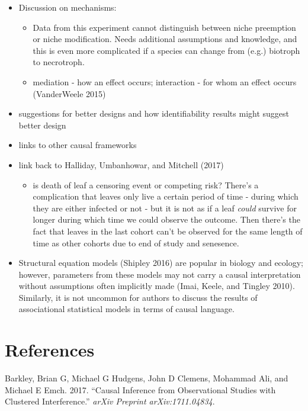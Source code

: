 \documentclass[]{article}
\providecommand{\tightlist}{%
  \setlength{\itemsep}{0pt}\setlength{\parskip}{0pt}}
\begin{document}
\begin{itemize}
\tightlist
\item
  Discussion on mechanisms:

  \begin{itemize}
  \tightlist
  \item
    Data from this experiment cannot distinguish between niche
    preemption or niche modification. Needs additional assumptions and
    knowledge, and this is even more complicated if a species can change
    from (e.g.) biotroph to necrotroph.
  \item
    mediation - how an effect occurs; interaction - for whom an effect
    occurs (VanderWeele 2015)
  \end{itemize}
\item
  suggestions for better designs and how identifiability results might
  suggest better design
\item
  links to other causal frameworks
\item
  link back to Halliday, Umbanhowar, and Mitchell (2017)

  \begin{itemize}
  \tightlist
  \item
    is death of leaf a censoring event or competing risk? There's a
    complication that leaves only live a certain period of time - during
    which they are either infected or not - but it is not as if a leaf
    \emph{could} survive for longer during which time we could observe
    the outcome. Then there's the fact that leaves in the last cohort
    can't be observed for the same length of time as other cohorts due
    to end of study and senesence.
  \end{itemize}
\item
  Structural equation models (Shipley 2016) are popular in biology and
  ecology; however, parameters from these models may not carry a causal
  interpretation without assumptions often implicitly made (Imai, Keele,
  and Tingley 2010). Similarly, it is not uncommon for authors to
  discuss the results of associational statistical models in terms of
  causal language.
\end{itemize}

\hypertarget{references}{%
\section*{References}\label{references}}

\hypertarget{refs}{}
\leavevmode\hypertarget{ref-barkley2017causal}{}%
Barkley, Brian G, Michael G Hudgens, John D Clemens, Mohammad Ali, and
Michael E Emch. 2017. ``Causal Inference from Observational Studies with
Clustered Interference.'' \emph{arXiv Preprint arXiv:1711.04834}.
\end{document}
